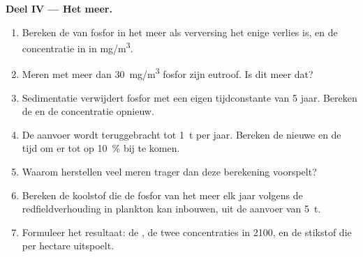 \begin{problem}
\medskip
\noindent\textbf{Deel IV --- Het meer.}
\begin{enumerate}[resume]
  \item Bereken de  van fosfor in het meer als verversing het
        enige verlies is, en de concentratie in  in
        \unit{mg/m^3}.
  \item Meren met meer dan \qty{30}{mg/m^3} fosfor zijn
        eutroof. Is dit meer dat?
  \item Sedimentatie verwijdert fosfor met een eigen tijdconstante
        van 5 jaar. Bereken de  en de concentratie opnieuw.
  \item De aanvoer wordt teruggebracht tot \qty{1}{t} per jaar. Bereken de nieuwe
         en de tijd om er tot op \qty{10}{\%} bij te komen.
  \item Waarom herstellen veel meren trager dan deze berekening
        voorspelt?
  \item Bereken de koolstof die de fosfor van het meer elk jaar volgens de
        redfieldverhouding in plankton kan inbouwen, uit de aanvoer van
        \qty{5}{t}.
  \item Formuleer het resultaat: de , de twee
        concentraties in 2100, en de stikstof die per hectare
        uitspoelt.
\end{enumerate}
\end{problem}
